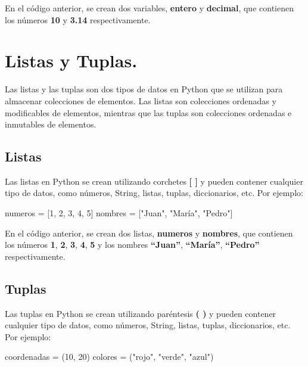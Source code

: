 \documentclass[
  a4paper,
  DIV=11,
  numbers=noendperiod,
  onepage,
  openany]{scrreprt}
\newenvironment{Shaded}{\begin{snugshade}}{\end{snugshade}}
\newcommand{\DecValTok}[1]{\textcolor[rgb]{0.68,0.00,0.00}{#1}}
\newcommand{\NormalTok}[1]{\textcolor[rgb]{0.00,0.23,0.31}{#1}}
\newcommand{\OperatorTok}[1]{\textcolor[rgb]{0.37,0.37,0.37}{#1}}
\newcommand{\StringTok}[1]{\textcolor[rgb]{0.13,0.47,0.30}{#1}}
\begin{document}
En el código anterior, se crean dos variables, \textbf{entero} y
\textbf{decimal}, que contienen los números \textbf{10} y \textbf{3.14}
respectivamente.

\section{Listas y Tuplas.}\label{listas-y-tuplas.}

Las listas y las tuplas son dos tipos de datos en Python que se utilizan
para almacenar colecciones de elementos. Las listas son colecciones
ordenadas y modificables de elementos, mientras que las tuplas son
colecciones ordenadas e inmutables de elementos.

\subsection{Listas}\label{listas}

Las listas en Python se crean utilizando corchetes \textbf{{[} {]}} y
pueden contener cualquier tipo de datos, como números, String, listas,
tuplas, diccionarios, etc. Por ejemplo:

\begin{Shaded}
\begin{Highlighting}[]
\NormalTok{numeros }\OperatorTok{=}\NormalTok{ [}\DecValTok{1}\NormalTok{, }\DecValTok{2}\NormalTok{, }\DecValTok{3}\NormalTok{, }\DecValTok{4}\NormalTok{, }\DecValTok{5}\NormalTok{]}
\NormalTok{nombres }\OperatorTok{=}\NormalTok{ [}\StringTok{"Juan"}\NormalTok{, }\StringTok{"María"}\NormalTok{, }\StringTok{"Pedro"}\NormalTok{]}
\end{Highlighting}
\end{Shaded}

En el código anterior, se crean dos listas, \textbf{numeros} y
\textbf{nombres}, que contienen los números \textbf{1}, \textbf{2},
\textbf{3}, \textbf{4}, \textbf{5} y los nombres \textbf{``Juan''},
\textbf{``María''}, \textbf{``Pedro''} respectivamente.

\subsection{Tuplas}\label{tuplas}

Las tuplas en Python se crean utilizando paréntesis \textbf{( )} y
pueden contener cualquier tipo de datos, como números, String, listas,
tuplas, diccionarios, etc. Por ejemplo:

\begin{Shaded}
\begin{Highlighting}[]
\NormalTok{coordenadas }\OperatorTok{=}\NormalTok{ (}\DecValTok{10}\NormalTok{, }\DecValTok{20}\NormalTok{)}
\NormalTok{colores }\OperatorTok{=}\NormalTok{ (}\StringTok{"rojo"}\NormalTok{, }\StringTok{"verde"}\NormalTok{, }\StringTok{"azul"}\NormalTok{)}
\end{Highlighting}
\end{Shaded}
\end{document}
